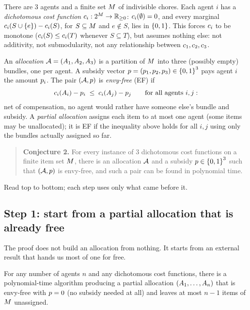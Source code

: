 There are $3$ agents and a finite set $M$ of indivisible chores. Each
agent $i$ has a \emph{dichotomous cost function} $c_i : 2^{M} \to
\mathbb{R}_{\ge0}$: $c_i(\emptyset) = 0$, and every marginal $c_i(S \cup
\left\{e\right\}) - c_i(S)$, for $S \subseteq M$ and $e \notin S$, lies in
$\left\{0,1\right\}$. This forces $c_i$ to be monotone ($c_i(S) \le
c_i(T)$ whenever $S \subseteq T$), but assumes nothing else: not
additivity, not submodularity, not any relationship between $c_1,
c_2, c_3$.

An \emph{allocation} $\mathcal{A} = (A_{1},A_{2},A_{3})$ is a partition
of $M$ into three (possibly empty) bundles, one per agent. A subsidy
vector $p = (p_1,p_2,p_3) \in \left\{0,1\right\}^3$ pays
agent $i$ the amount $p_i$. The pair $(\mathcal{A},p)$ is
\emph{envy-free} (EF) if
\[
  c_i(A_{i}) - p_i \;\le\; c_i(A_{j}) - p_j
  \qquad \text{for all agents } i,j:
\]
net of compensation, no agent would rather have someone else's bundle and
subsidy. A \emph{partial allocation} assigns each item to at most one agent
(some items may be unallocated); it is EF if the inequality above holds for
all $i,j$ using only the bundles actually assigned so far.

\begin{quote}
\textbf{Conjecture 2.} For every instance of $3$ dichotomous cost functions
on a finite item set $M$, there is an allocation $\mathcal{A}$ and a subsidy
$p \in \left\{0,1\right\}^3$ such that $(\mathcal{A},p)$ is envy-free, and
such a pair can be found in polynomial time.
\end{quote}

Read top to bottom; each step uses only what came before it.

\subsection{Step 1: start from a partial allocation that is already free}
\label{sec:g2-step1}

The proof does not build an allocation from nothing. It starts from an
external result that hands us most of one for free.

\begin{theorem}
\label{thm:g2-twyz}
For any number of agents $n$ and any dichotomous cost functions, there is a
polynomial-time algorithm producing a partial allocation
$(A_{1},\dots,A_{n})$ that is envy-free with $p = 0$ (no
subsidy needed at all) and leaves at most $n-1$ items of $M$
unassigned.
\end{theorem}

